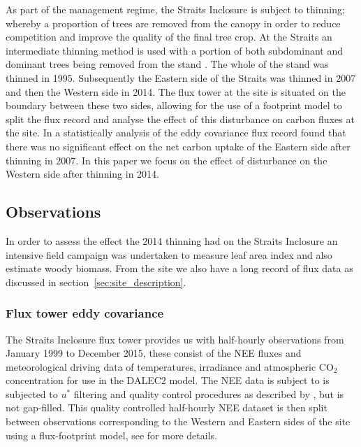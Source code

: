 \documentclass[11pt]{article}
\begin{document}
As part of the management regime, the Straits Inclosure is subject to thinning; whereby a proportion of trees are removed from the canopy in order to reduce competition and improve the quality of the final tree crop. At the Straits an intermediate thinning method is used with a portion of both subdominant and dominant trees being removed from the stand \citep{kerr2011thinning}. The whole of the stand was thinned in 1995. Subsequently the Eastern side of the Straits was thinned in 2007 and then the Western side in 2014. The flux tower at the site is situated on the boundary between these two sides, allowing for the use of a footprint model to split the flux record and analyse the effect of this disturbance on carbon fluxes at the site. In \citet{wilkinson2015effects} a statistically analysis of the eddy covariance flux record found that there was no significant effect on the net carbon uptake of the Eastern side after thinning in 2007. In this paper we focus on the effect of disturbance on the Western side after thinning in 2014.   

\subsection{Observations} \label{sec:obs}

In order to assess the effect the 2014 thinning had on the Straits Inclosure an intensive field campaign was undertaken to measure leaf area index and also estimate woody biomass. From the site we also have a long record of flux data as discussed in section~\ref{sec:site_description}.

\subsubsection{Flux tower eddy covariance} \label{sec:eddycov} 

The Straits Inclosure flux tower provides us with half-hourly observations from January 1999 to December 2015, these consist of the NEE fluxes and meteorological driving data of temperatures, irradiance and atmospheric CO\(_{2}\) concentration for use in the DALEC2 model. The NEE data is subject to is subjected to \(u^*\) filtering and quality control procedures as described by \citet{papale2006towards}, but is not gap-filled. This quality controlled half-hourly NEE dataset is then split between observations corresponding to the Western and Eastern sides of the site using a flux-footprint model, see \citet{wilkinson2015effects} for more details.  
\end{document}
